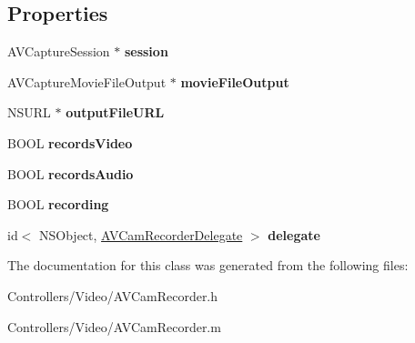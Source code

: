 \subsection*{Properties}
\begin{DoxyCompactItemize}
\item 
\hypertarget{interface_a_v_cam_recorder_aa64f88940130f4d14cf4dd6399b55463}{}A\+V\+Capture\+Session $\ast$ {\bfseries session}\label{interface_a_v_cam_recorder_aa64f88940130f4d14cf4dd6399b55463}

\item 
\hypertarget{interface_a_v_cam_recorder_a1e1662da85b6dc22f7505fa22a49fdc7}{}A\+V\+Capture\+Movie\+File\+Output $\ast$ {\bfseries movie\+File\+Output}\label{interface_a_v_cam_recorder_a1e1662da85b6dc22f7505fa22a49fdc7}

\item 
\hypertarget{interface_a_v_cam_recorder_ae24c52c6539d005e0367db29d3927bcb}{}N\+S\+U\+R\+L $\ast$ {\bfseries output\+File\+U\+R\+L}\label{interface_a_v_cam_recorder_ae24c52c6539d005e0367db29d3927bcb}

\item 
\hypertarget{interface_a_v_cam_recorder_a00a4d1713c71edb44e41d120d8517c85}{}B\+O\+O\+L {\bfseries records\+Video}\label{interface_a_v_cam_recorder_a00a4d1713c71edb44e41d120d8517c85}

\item 
\hypertarget{interface_a_v_cam_recorder_a930a87c59a1daf9d85f3240bc192442f}{}B\+O\+O\+L {\bfseries records\+Audio}\label{interface_a_v_cam_recorder_a930a87c59a1daf9d85f3240bc192442f}

\item 
\hypertarget{interface_a_v_cam_recorder_a0b14db51f9d37da7450b3395b32e3467}{}B\+O\+O\+L {\bfseries recording}\label{interface_a_v_cam_recorder_a0b14db51f9d37da7450b3395b32e3467}

\item 
\hypertarget{interface_a_v_cam_recorder_a277c7cd3484d53985268ef3c4964b083}{}id$<$ N\+S\+Object, \hyperlink{protocol_a_v_cam_recorder_delegate-p}{A\+V\+Cam\+Recorder\+Delegate} $>$ {\bfseries delegate}\label{interface_a_v_cam_recorder_a277c7cd3484d53985268ef3c4964b083}

\end{DoxyCompactItemize}


The documentation for this class was generated from the following files\+:\begin{DoxyCompactItemize}
\item 
Controllers/\+Video/A\+V\+Cam\+Recorder.\+h\item 
Controllers/\+Video/A\+V\+Cam\+Recorder.\+m\end{DoxyCompactItemize}
